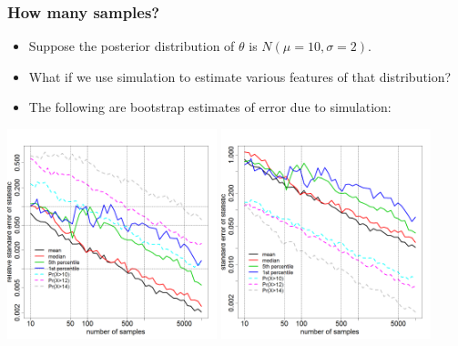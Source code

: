 \documentclass{beamer}
\begin{document}
\begin{frame}
  \frametitle{How many samples?}

\vspace{-0.1in}
\begin{footnotesize}
\begin{itemize}
\item Suppose the posterior distribution of $\theta$ is $N\left(\mu = 10, \sigma = 2\right)$.
\item What if we use simulation to estimate various features of that distribution?
\item The following are bootstrap estimates of error due to simulation:
\end{itemize}
\end{footnotesize}
\vspace{-0.1in}
\includegraphics[width=2.4in]{graphics/simPrecision001.png}
\includegraphics[width=2.4in]{graphics/simPrecision002.png}

\end{frame}
\end{document}
